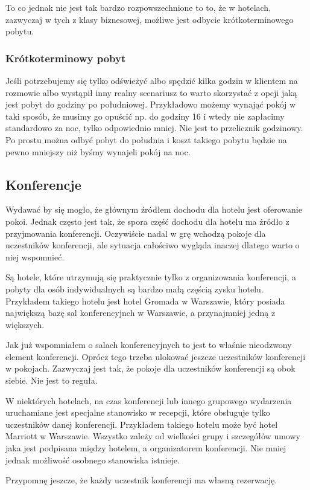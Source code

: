 \documentclass[12pt, a4paper]{article}
\begin{document}
To co jednak nie jest tak bardzo rozpowszechnione to to, że w hotelach,
zazwyczaj w tych z klasy biznesowej, możliwe jest odbycie krótkoterminowego
pobytu.
\subsubsection{Krótkoterminowy pobyt}
Jeśli potrzebujemy się tylko odświeżyć albo spędzić kilka godzin w klientem na
rozmowie albo wystąpił inny realny scenariusz to warto skorzystać z opcji jaką
jest pobyt do godziny po południowej.
Przykładowo możemy wynająć pokój w taki sposób, że musimy go opuścić np. do
godziny 16 i wtedy nie zapłacimy standardowo za noc, tylko odpowiednio mniej.
Nie jest to przelicznik godzinowy. Po prostu można odbyć pobyt do południa i
koszt takiego pobytu będzie na pewno mniejszy niż byśmy wynajeli pokój na noc.

\subsection{Konferencje}
Wydawać by się mogło, że głównym źródłem dochodu dla hotelu jest oferowanie
pokoi. Jednak często jest tak, że spora część dochodu dla hotelu ma źródło z
przyjmowania konferencji. Oczywiście nadal w grę wchodzą pokoje dla uczestników
konferencji, ale sytuacja całościwo wygląda inaczej dlatego warto o niej
wspomnieć.

Są hotele, które utrzymują się praktycznie tylko z organizowania konferencji, a
pobyty dla osób indywidualnych są bardzo małą częścią zysku hotelu. Przykładem
takiego hotelu jest hotel Gromada w Warszawie, który posiada największą bazę sal
konferencyjnch w Warszawie, a przynajmniej jedną z większych.

Jak już wspomniałem o salach konferencyjnych to jest to właśnie nieodzwony
element konferencji. Oprócz tego trzeba ulokować jeszcze uczestników
konferencji w pokojach. Zazwyczaj jest tak, że pokoje dla uczestników
konferencji są obok siebie. Nie jest to reguła.

W niektórych hotelach, na czas konferencji lub innego grupowego wydarzenia
uruchamiane jest specjalne stanowisko w recepcji, które obsługuje tylko
uczestników danej konferencji. Przykładem takiego hotelu może być hotel Marriott
w Warszawie. Wszystko zależy od wielkości grupy i szczegółów umowy jaka jest
podpisana między hotelem, a organizatorem konferencji. Nie mniej jednak
możliwość osobnego stanowiska istnieje. 

Przypomnę jeszcze, że każdy uczestnik konferencji ma własną rezerwację.
\end{document}
